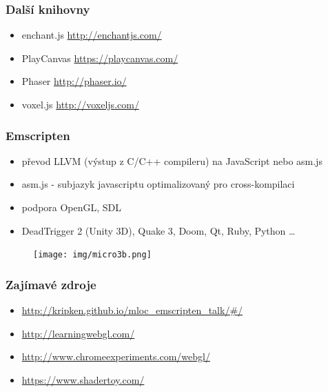 \documentclass{beamer}
\begin{document}
	
	
		\begin{frame}[t,fragile]
		\frametitle{Další knihovny}					
		\begin{itemize}
				\item enchant.js \url{http://enchantjs.com/}
	\item PlayCanvas \url{https://playcanvas.com/}
	\item Phaser \url{http://phaser.io/}
	\item voxel.js \url{http://voxeljs.com/}
		\end{itemize}	

	\end{frame}
	
	
		\begin{frame}[t,fragile]
		\frametitle{Emscripten}					
		\begin{itemize}
			\item převod LLVM (výstup z C/C++ compileru) na JavaScript nebo asm.js
			\item asm.js - subjazyk javascriptu optimalizovaný pro cross-kompilaci
			\item podpora OpenGL, SDL
			\item DeadTrigger 2 (Unity 3D), Quake 3, Doom, Qt, Ruby, Python \dots
		\end{itemize}	
		\begin{figure}		
		\centering
		\texttt{[image: img/micro3b.png]}
		\end{figure}

	\end{frame}
	
		
	\begin{frame}[t,fragile]
	
		\frametitle{Zajímavé zdroje}					
		\begin{itemize}
			\item \footnotesize{\url{http://kripken.github.io/mloc_emscripten_talk/#/}}
			\item \url{http://learningwebgl.com/}
			\item \url{http://www.chromeexperiments.com/webgl/}
			\item \url{https://www.shadertoy.com/}
		\end{itemize}			

	\end{frame}
	
	
\end{document}
